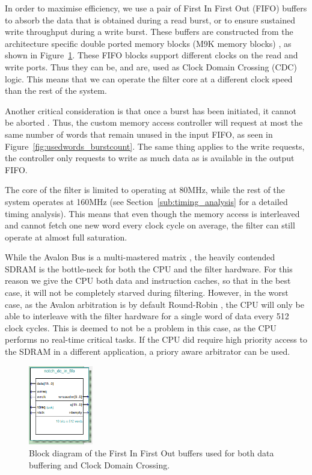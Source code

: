 \documentclass[]{article}
\begin{document}
In order to maximise efficiency, we use a pair of First In First Out (FIFO) buffers to absorb the data that is obtained during a read burst, or to ensure sustained write throughput during a write burst.
These buffers are constructed from the architecture specific double ported memory blocks (M9K memory blocks) \cite{m9k}, as shown in Figure~\ref{fig:fifoblock}.
These FIFO blocks support different clocks on the read and write ports. Thus they can be, and are, used as Clock Domain Crossing (CDC) logic. This means that we can operate the filter core at a different clock speed than the rest of the system.

Another critical consideration is that once a burst has been initiated, it cannot be aborted \cite{AvalonSpec}.
Thus, the custom memory access controller will request at most the same number of words that remain unused in the input FIFO, as seen in Figure~\ref{fig:usedwords_burstcount}. The same thing applies to the write requests, the controller only requests to write as much data as is available in the output FIFO.

The core of the filter is limited to operating at 80MHz, while the rest of the system operates at 160MHz (see Section~\ref{sub:timing_analysis} for a detailed timing analysis). This means that even though the memory access is interleaved and cannot fetch one new word every clock cycle on average, the filter can still operate at almost full saturation.

While the Avalon Bus is a multi-mastered matrix \cite{AvalonSpec}, the heavily contended SDRAM is the bottle-neck for both the CPU and the filter hardware. For this reason we give the CPU both data and instruction caches, so that in the best case, it will not be completely starved during filtering.
However, in the worst case, as the Avalon arbitration is by default Round-Robin \cite{AvalonSpec}, the CPU will only be able to interleave with the filter hardware for a single word of data every 512 clock cycles.
This is deemed to not be a problem in this case, as the CPU performs no real-time critical tasks. If the CPU did require high priority access to the SDRAM in a different application, a priory aware arbitrator can be used.

\begin{figure}[bp]
	\begin{center}
		\includegraphics[width = 0.25\textwidth]{fifoBlock.PNG}
	\end{center}
	\caption{Block diagram of the First In First Out buffers used for both data buffering and Clock Domain Crossing.}
	\label{fig:fifoblock}
\end{figure}
\end{document}
